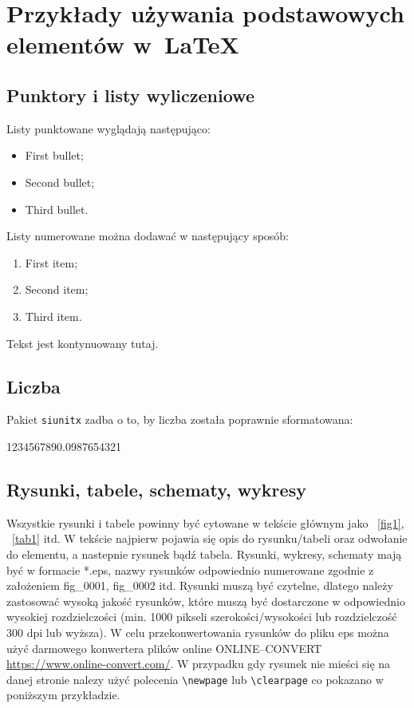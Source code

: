 \chapter{Przykłady używania podstawowych elementów w~\LaTeX}
\label{cha:elementyPracy}

\section{Punktory i listy wyliczeniowe}

Listy punktowane wyglądają następująco:
\begin{itemize}
    \item	First bullet;
    \item	Second bullet;
    \item	Third bullet.
\end{itemize}

Listy numerowane można dodawać w następujący sposób:
\begin{enumerate}
    \item	First item;
    \item	Second item;
    \item	Third item.
\end{enumerate}

Tekst jest kontynuowany tutaj.

\section{Liczba}

Pakiet \texttt{siunitx} zadba o to, by liczba została poprawnie sformatowana: \\
\begin{center}
    \num{1234567890.0987654321}
\end{center}

\section{Rysunki, tabele, schematy, wykresy}

Wszystkie rysunki i tabele powinny być cytowane w tekście głównym jako \figurename~\ref{fig1}, \tablename~\ref{tab1} itd.
W tekście najpierw pojawia się opis do rysunku/tabeli oraz odwołanie do elementu, a nastepnie rysunek bądź tabela. Rysunki, wykresy, schematy mają być w formacie *.eps, nazwy rysunków odpowiednio numerowane zgodnie z założeniem fig\_0001, fig\_0002 itd. Rysunki muszą być czytelne, dlatego należy zastosować wysoką jakość rysunków, które muszą być dostarczone w odpowiednio wysokiej rozdzielczości (min. 1000 pikseli szerokości/wysokości lub rozdzielczość 300 dpi lub wyższa). W celu przekonwertowania rysunków do pliku eps można użyć darmowego konwertera plików online ONLINE--CONVERT \url{https://www.online-convert.com/}. W przypadku gdy rysunek nie mieści się na danej stronie nalezy użyć polecenia \texttt{\textbackslash newpage} lub \texttt{\textbackslash clearpage} co pokazano w poniższym przykładzie.

